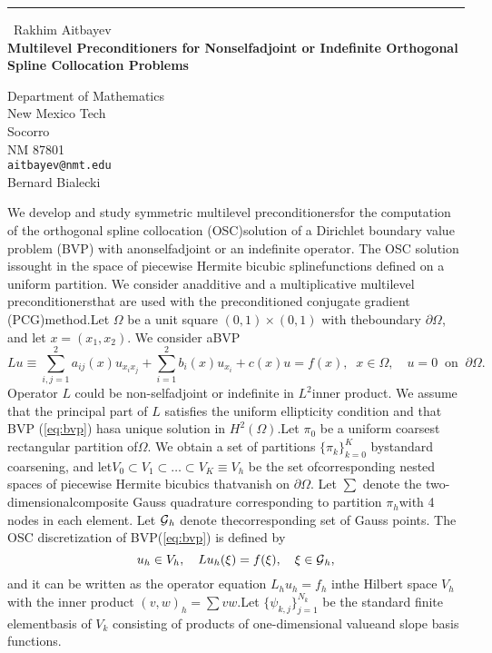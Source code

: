 \documentclass{report}
\begin{document}
\begin{center}
\rule{6in}{1pt} \
{\large Rakhim Aitbayev \\
{\bf Multilevel Preconditioners for Nonselfadjoint or Indefinite Orthogonal Spline Collocation Problems}}

Department of Mathematics \\ New Mexico Tech \\ Socorro \\ NM 87801
\\
{\tt aitbayev@nmt.edu}\\
Bernard Bialecki\end{center}

\newtheorem{theorem}{Theorem}\newcommand{\GP}{\mbox{${\cal G}$}}\newcommand{\SH}{\mbox{$\scriptscriptstyle H^{2}(\Omega)$}}\newcommand{\SL}{\mbox{$\scriptscriptstyle L^{2}(\Omega)$}}We develop and study symmetric multilevel preconditionersfor the computation of the orthogonal spline collocation (OSC)solution of a Dirichlet boundary value problem (BVP) with anonselfadjoint or an indefinite operator.
The OSC solution issought in the space of piecewise Hermite bicubic splinefunctions defined on a uniform partition.
We consider anadditive and a multiplicative multilevel preconditionersthat are used with the preconditioned conjugate gradient (PCG)method.Let $\Omega$ be a unit square $(0,1)\times(0,1)$ with theboundary $\partial\Omega$,
and let $x=(x_1,x_2)$.
We consider aBVP\begin{equation}\label{eq:bvp}Lu\equiv\sum_{i,j=1}^{2} a_{ij}(x)u_{x_ix_j}+\sum_{i=1}^{2}b_i(x) u_{x_i}+c(x)u = f(x),\;\;x\in\Omega,\quad u=0 \;\;\mbox{on}\;\;\partial\Omega.\end{equation}Operator $L$ could be non-selfadjoint or indefinite in $L^2$inner product.
We assume that the principal part of $L$ satisfies the uniform ellipticity condition and that BVP (\ref{eq:bvp}) hasa unique solution in $H^2(\Omega)$.Let $\pi_0$ be a uniform coarsest rectangular partition of$\Omega$.
We obtain a set of partitions $\{\pi_k\}_{k=0}^{K}$ bystandard coarsening,
and let$V_0\subset V_1\subset\ldots\subset V_K\equiv V_h$ be the set ofcorresponding nested spaces of piecewise Hermite bicubics thatvanish on $\partial\Omega$.
Let $\sum$ denote the two-dimensionalcomposite Gauss quadrature corresponding to partition $\pi_h$with 4 nodes in each element.
Let $\GP_h$ denote thecorresponding set of Gauss points.
The OSC discretization of BVP(\ref{eq:bvp}) is defined by\begin{equation}\label{eq:osc}u_h\in V_h,\quad Lu_h(\xi)=f(\xi),\quad\xi\in\GP_h,\end{equation}and it can be written as the operator equation $L_hu_h=f_h$ inthe Hilbert space $V_h$ with the inner product $(v,w)_h=\sum vw$.Let $\{\psi_{k,j}\}_{j=1}^{N_k}$ be the standard finite elementbasis of $V_k$ consisting of products of one-dimensional valueand slope basis functions.
\end{document}
